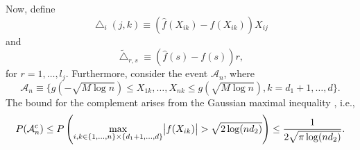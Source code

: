 Now, define
\begin{equation*}
    \bigtriangleup_i(j,k) \equiv (\hat{f}(X_{ik}) - f(X_{ik}))X_{ij}
\end{equation*}
and
\begin{equation*}
    \tilde{\bigtriangleup}_{r,s} \equiv (\hat{f}(s) - f(s))r,
\end{equation*}
for $r = 1, \dots, l_{j}$. Furthermore, consider the event $\mathcal{A}_n$, where
\begin{equation*}
    \mathcal{A}_n \equiv \{g(-\sqrt{M\log n}) \leq X_{1k}, \dots, X_{nk} \leq g(\sqrt{M\log n}), k = d_1 + 1, \dots, d\}.
\end{equation*}
The bound for the complement arises from the Gaussian maximal inequality \citet[Lemma 13]{Liu09}, i.e.,
\begin{equation*}
    P(\mathcal{A}_n^c) \leq P\left(\max_{i,k\in \{1,\dots,n\}\times\{d_1+1, \dots, d\}} \abs{f(X_{ik})} > \sqrt{2\log(nd_2)}\right) \leq \frac{1}{2\sqrt{\pi\log(nd_2)}}.
\end{equation*}

